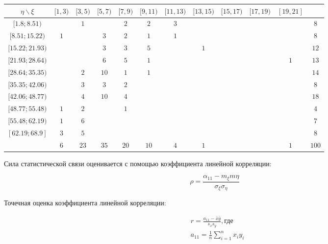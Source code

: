 \documentclass{report}
\begin{document}
\begin{table}[h]
\begin{tabularx}{\textwidth}{|c|c|c|c|c|c|c|c|c|c|c|c|}
\hline
  $\eta \backslash \xi$ & $[1,3)$ & $[3,5)$ & $[5,7)$ & $[7,9)$ & $[9,11)$ & $[11,13)$ & $[13,15)$ & $[15,17)$ & $[17,19)$ & $[19,21]$ & \\
\hline 
    $[ 1.8 ; 8.51)$ &     & $1$ &      & $2$  & $2$ & $3$ &     & & &     & $8$  \\
    $[ 8.51;15.22)$ & $1$ &     & $3$  & $2$  & $1$ & $1$ &     & & &     & $8$  \\
    $[15.22;21.93)$ &     &     & $3$  & $3$  & $5$ &     & $1$ & & &     & $12$ \\
    $[21.93;28.64)$ &     &     & $6$  & $5$  & $1$ &     &     & & & $1$ & $13$ \\
    $[28.64;35.35)$ &     & $2$ & $10$ & $1$  & $1$ &     &     & & &     & $14$ \\
    $[35.35;42.06)$ &     & $3$ & $3$  & $2$  &     &     &     & & &     & $8$  \\
    $[42.06;48.77)$ &     & $4$ & $10$ & $4$  &     &     &     & & &     & $18$ \\
    $[48.77;55.48)$ & $1$ & $2$ &      & $1$  &     &     &     & & &     & $4$  \\
    $[55.48;62.19)$ & $1$ & $6$ &      &      &     &     &     & & &     & $7$  \\
    $[62.19;68.9 ]$ & $3$ & $5$ &      &      &     &     &     & & &     & $8$  \\
\hline
                   & $6$ & $23$ & $35$ & $20$ & $10$ & $4$ & $1$ & & & $1$ & $100$\\
\hline
\end{tabularx}
\end{table}

Сила статистической связи оценивается с помощью коэффициента линейной корреляции:

\begin{equation}
\rho = \frac{\alpha_{11} - m_\xi m\eta}{\sigma_\xi \sigma_\eta}
\end{equation}

Точечная оценка коэффициента линейной корреляции:

\begin{equation}
\begin{split}
& r = \frac{a_{11} - \bar x \bar y}{s_x s_y}, \text{где} \\
& a_{11} = \frac{1}{n} \sum \limits^{n}_{i=1}x_i y_i  
\end{split}
\end{equation}
\end{document}
